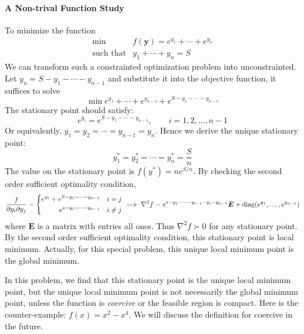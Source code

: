 \paragraph{A Non-trival Function Study}
To minimize the function
\[
\begin{array}{ll}
\min&f(\bm y)=e^{y_1}+\cdots+e^{y_n}\\
\mbox{such that}&y_1+\cdots+y_n=S
\end{array}
\]
We can transform such a constrainted optimization problem into unconstrainted. Let $y_n=S-y_1-\cdots-y_{n-1}$ and substitute it into the objective function, it suffices to solve
\[
\min e^{y_1}+\cdots+e^{y_{n-1}}+e^{S-y_1-\cdots-y_{n-1}}
\]
The stationary point should satisfy:
\[
e^{y_i}=e^{S-y_1-\cdots-y_{n-1}},
\qquad
i=1,2,\dots,n-1
\]
Or equivalently, $y_1=y_2=\cdots=y_{n-1}=y_n$. Hence we derive the unique stationary point:
\[
y_1^*=y_2^*=\cdots=y_n^*=\frac{S}{n}
\]
The value on the stationary point is $f(y^*)=ne^{S/n}$. By checking the second order sufficient optimality condition,
\[
\frac{f}{\partial y_i\partial y_j}=\left\{
\begin{aligned}
e^{y_i}+e^{S-y_1-\cdots-y_{n-1}}&\quad i=j\\
e^{s-y_1-\cdots-y_{n-1}}&\quad i\ne j
\end{aligned}
\right.\implies
\nabla^2 f=e^{s-y_1-\cdots-y_{i-1}-y_i-y_{n-1}}\bm E
+\operatorname{diag}(e^{y_1},\dots,e^{y_{n-1}})
\]
where $\bm E$ is a matrix with entries all ones. Thus $\nabla^2 f\succ0$ for any stationary point. By the second order sufficient optimality condition, this stationary point is local minimum. Actually, for this special problem, this unique local minimum point is the global minimum.
\begin{remark}
In this problem, we find that this stationary point is the unique local minimum point, but the unique local minimum point is not necessarily the global minimum point, unless the function is \emph{coercive} or the feasible region is compact. Here is the counter-example: $f(x)=x^2-x^4$. We will discuss the definition for coercive in the future.
\end{remark}









